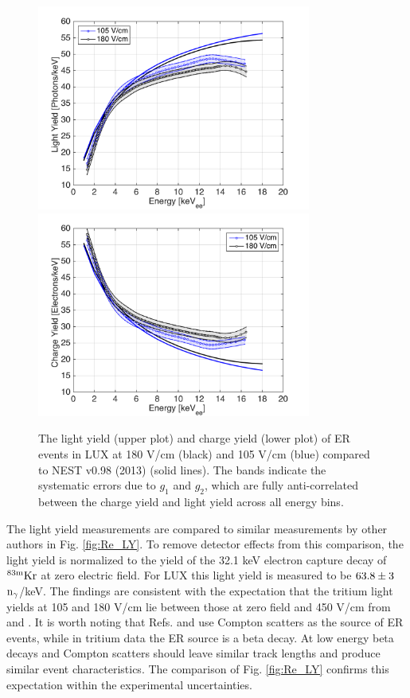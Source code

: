 \begin{figure}[h!]\centering
\includegraphics[width=90mm]{fig/ER_LY.png}
\includegraphics[width=90mm]{fig/ER_QY.png}
\caption{The light yield (upper plot) and charge yield (lower plot) of ER events in LUX at 180 V/cm (black) and 105 V/cm (blue) compared to NEST v0.98 (2013) (solid lines)\cite{NEST_2013}. The bands indicate the systematic errors due to $g_1$ and $g_2$, which are fully anti-correlated between the charge yield and light yield across all energy bins. }
\label{fig:ER-LY-QY}
\end{figure}

The light yield measurements are compared to similar measurements by other authors in Fig. \ref{fig:Re_LY}. To remove detector effects from this comparison, the light yield is normalized to the yield of the 32.1 keV electron capture decay of $\rm ^{83m}Kr$ at zero electric field. For LUX this light yield is measured to be $\rm 63.8 \pm 3$ $\rm n_\gamma$/keV. The findings are consistent with the expectation that the tritium light yields at 105 and 180 V/cm lie between those at zero field and 450 V/cm from \cite{Aprile_LY} and \cite{Baudis}. It is worth noting that Refs. \cite{Aprile_LY} and \cite{Baudis} use Compton scatters as the source of ER events, while in tritium data the ER source is a beta decay. At low energy beta decays and Compton scatters should leave similar track lengths and produce similar event characteristics. The comparison of Fig. \ref{fig:Re_LY} confirms this expectation within the experimental uncertainties.

